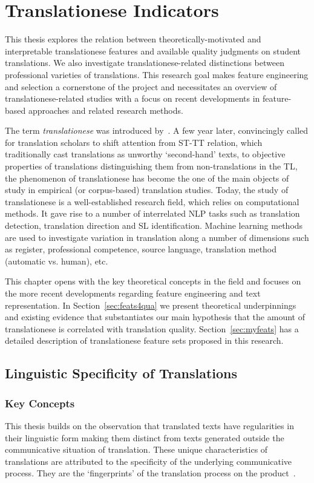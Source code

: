 \chapter{\label{cha:indicators}Translationese Indicators}
This thesis explores the relation between theoretically-motivated and interpretable translationese features and available quality judgments on student translations. We also investigate translationese-related distinctions between professional varieties of translations. 
This research goal makes feature engineering and selection a cornerstone of the project and necessitates an overview of translationese-related studies with a focus on recent developments in feature-based approaches and related research methods.

The term \textit{translationese} was introduced by~\citet{Gellerstam1986}. A few year later, \citet{Baker1993} convincingly called for translation scholars to shift attention from \gls{ST}-\gls{TT} relation, which traditionally cast translations as unworthy `second-hand' texts, to objective properties of translations distinguishing them from non-translations in the TL, the phenomenon of translationese has become the one of the main objects of study in empirical (or corpus-based) translation studies. 
Today, the study of translationese is a well-established research field, which relies on computational methods. It gave rise to a number of interrelated \gls{NLP} tasks such as translation detection, translation direction and SL identification. Machine learning methods are used to investigate variation in translation along a number of dimensions such as register, professional competence, source language, translation method (automatic vs. human), etc.

This chapter opens with the key theoretical concepts in the field and focuses on the more recent developments regarding feature engineering and text representation. In Section~\ref{sec:feats4qua} we present theoretical underpinnings and existing evidence that substantiates our main hypothesis that the amount of translationese is correlated with translation quality. Section~\ref{sec:myfeats} has a detailed description of translationese feature sets proposed in this research.  

\section{\label{sec:linguistic}Linguistic Specificity of Translations}
\subsection{\label{ssec:keyterms}Key Concepts}
This thesis builds on the observation that translated texts have regularities in their linguistic form making them distinct from texts generated outside the communicative situation of translation. These unique characteristics of translations are attributed to the specificity of the underlying communicative process. They are the `fingerprints' of the translation process on the product~\cite{Gellerstam1986}.


